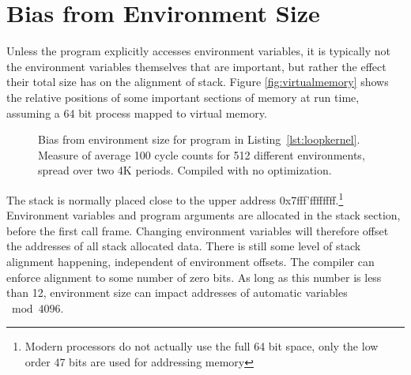 \documentclass[a4paper,10pt,twocolumn,twoside]{article}
\begin{document}
\section{Bias from Environment Size}
Unless the program explicitly accesses environment variables, it is typically not the environment variables themselves that are important, but rather the effect their total size has on the alignment of stack. 
Figure \ref{fig:virtualmemory} shows the relative positions of some important sections of memory at run time, assuming a 64 bit process mapped to virtual memory. 

\begin{figure}[t]
  \caption{Bias from environment size for program in Listing~\ref{lst:loopkernel}. Measure of average 100 cycle counts for 512 different environments, spread over two 4K periods. Compiled with no optimization.}
  \label{fig:envbias}
\end{figure}

The stack is normally placed close to the upper address 0x7fff'ffffffff.\footnote{Modern processors do not actually use the full 64 bit space, only the low order 47 bits are used for addressing memory}
Environment variables and program arguments are allocated in the stack section, before the first call frame.
Changing environment variables will therefore offset the addresses of all stack allocated data.
There is still some level of stack alignment happening, independent of environment offsets. 
The compiler can enforce alignment to some number of zero bits.
As long as this number is less than 12, environment size can impact addresses of automatic variables $\bmod 4096$.
\end{document}
